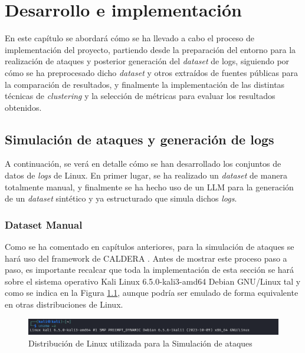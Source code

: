 \chapter{Desarrollo e implementación}

En este capítulo se abordará cómo se ha llevado a cabo el proceso de implementación del proyecto, partiendo desde la preparación del entorno para la realización de ataques y posterior generación del \textit{dataset} de logs, siguiendo por cómo se ha preprocesado dicho \textit{dataset} y otros extraídos de fuentes públicas para la comparación de resultados, y finalmente la implementación de las distintas técnicas de \textit{clustering} y la selección de métricas para evaluar los resultados obtenidos.


\section{Simulación de ataques y generación de logs}

A continuación, se verá en detalle cómo se han desarrollado los conjuntos de datos de \textit{logs} de Linux. En primer lugar, se ha realizado un \textit{dataset} de manera totalmente manual, y finalmente se ha hecho uso de un \gls{LLM} para la generación de un \textit{dataset} sintético y ya estructurado que simula dichos \textit{logs}.

\vspace{-3mm}

\subsection{Dataset Manual}

Como se ha comentado en capítulos anteriores, para la simulación de ataques se hará uso del framework de \gls{CALDERA} \cite{caldera}. Antes de mostrar este proceso paso a paso, es importante recalcar que toda la implementación de esta sección se hará sobre el sistema operativo Kali Linux 6.5.0-kali3-amd64 Debian \gls{GNU}/Linux  tal y como se indica en la Figura \ref{fig:uname-kali}, aunque podría ser emulado de forma equivalente en otras distribuciones de Linux.

\begin{figure}[H]
    \centering
    \includegraphics[width=1\linewidth]{imagenes/uname-kali.png}
    \caption{Distribución de Linux utilizada para la Simulación de ataques}
    \label{fig:uname-kali}
\end{figure}


